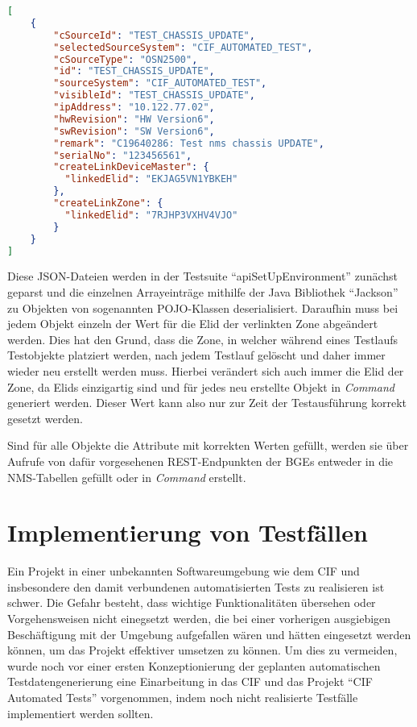 \begin{lstlisting}[caption=Testdaten für ein Chassis in JSON-Form, label=JSON-Testdaten,language=json]
[
    {
        "cSourceId": "TEST_CHASSIS_UPDATE",
        "selectedSourceSystem": "CIF_AUTOMATED_TEST",
        "cSourceType": "OSN2500",
        "id": "TEST_CHASSIS_UPDATE",
        "sourceSystem": "CIF_AUTOMATED_TEST",
        "visibleId": "TEST_CHASSIS_UPDATE",
        "ipAddress": "10.122.77.02",
        "hwRevision": "HW Version6",
        "swRevision": "SW Version6",
        "remark": "C19640286: Test nms chassis UPDATE",
        "serialNo": "123456561",
        "createLinkDeviceMaster": {
          "linkedElid": "EKJAG5VN1YBKEH"
        },
        "createLinkZone": {
          "linkedElid": "7RJHP3VXHV4VJO"
        }
    }
]
\end{lstlisting}

Diese \ac{JSON}-Dateien werden in der Testsuite \enquote{apiSetUpEnvironment} zunächst geparst und die einzelnen Arrayeinträge mithilfe der Java Bibliothek \enquote{Jackson} zu Objekten von sogenannten \ac{POJO}-Klassen deserialisiert. Daraufhin muss bei jedem Objekt einzeln der Wert für die \ac{Elid} der verlinkten Zone abgeändert werden. Dies hat den Grund, dass die Zone, in welcher während eines Testlaufs Testobjekte platziert werden, nach jedem Testlauf gelöscht und daher immer wieder neu erstellt werden muss. Hierbei verändert sich auch immer die \ac{Elid} der Zone, da \ac{Elid}s einzigartig sind und für jedes neu erstellte Objekt in \textit{Command} generiert werden. Dieser Wert kann also nur zur Zeit der Testausführung korrekt gesetzt werden.

Sind für alle Objekte die Attribute mit korrekten Werten gefüllt, werden sie über Aufrufe von dafür vorgesehenen \ac{REST}-Endpunkten der \ac{BGE}s entweder in die \ac{NMS}-Tabellen gefüllt oder in \textit{Command} erstellt.

\section{Implementierung von Testfällen}\label{sec:testimplementierung}
Ein Projekt in einer unbekannten Softwareumgebung wie dem \ac{CIF} und insbesondere den damit verbundenen automatisierten Tests zu realisieren ist schwer. Die Gefahr besteht, dass wichtige Funktionalitäten übersehen oder Vorgehensweisen nicht einegsetzt werden, die bei einer vorherigen ausgiebigen Beschäftigung mit der Umgebung aufgefallen wären und hätten eingesetzt werden können, um das Projekt effektiver umsetzen zu können. Um dies zu vermeiden, wurde noch vor einer ersten Konzeptionierung der geplanten automatischen Testdatengenerierung eine Einarbeitung in das \ac{CIF} und das Projekt \enquote{CIF Automated Tests} vorgenommen, indem noch nicht realisierte Testfälle implementiert werden sollten.

